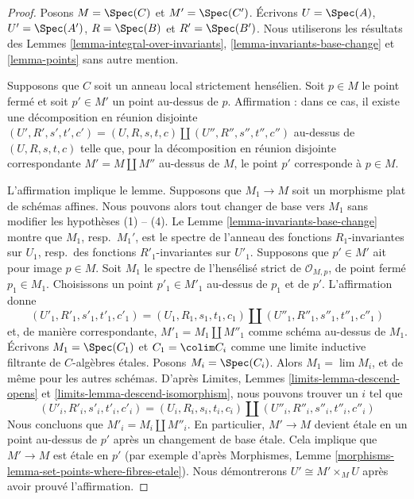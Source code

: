 \begin{proof}
Posons $M = \Spec(C)$ et $M' = \Spec(C')$.
Écrivons $U = \Spec(A)$, $U' = \Spec(A')$, $R = \Spec(B)$ et
$R' = \Spec(B')$. Nous utiliserons les résultats des
Lemmes \ref{lemma-integral-over-invariants},
\ref{lemma-invariants-base-change} et
\ref{lemma-points}
sans autre mention.

\medskip\noindent
Supposons que $C$ soit un anneau local strictement hensélien. Soit $p \in M$
le point fermé et soit $p' \in M'$ un point au-dessus de $p$.
Affirmation : dans ce cas, il existe une décomposition en réunion disjointe
$(U', R', s', t', c') = (U, R, s, t, c) \amalg (U'', R'', s'', t'', c'')$
au-dessus de $(U, R, s, t, c)$ telle que, pour la décomposition en
réunion disjointe correspondante $M' = M \amalg M''$ au-dessus de $M$,
le point $p'$ corresponde à $p \in M$.

\medskip\noindent
L'affirmation implique le lemme. Supposons que $M_1 \to M$ soit un morphisme plat
de schémas affines. Nous pouvons alors tout changer de base vers $M_1$
sans modifier les hypothèses (1) -- (4).
Le Lemme \ref{lemma-invariants-base-change} montre que
$M_1$, resp.\ $M_1'$, est le spectre de l'anneau des
fonctions $R_1$-invariantes sur $U_1$,
resp.\ des fonctions $R'_1$-invariantes sur $U'_1$.
Supposons que $p' \in M'$ ait pour image $p \in M$.
Soit $M_1$ le spectre de l'hensélisé strict de
$\mathcal{O}_{M, p}$, de point fermé $p_1 \in M_1$.
Choisissons un point $p'_1 \in M'_1$ au-dessus de $p_1$ et de $p'$.
L'affirmation donne
$$
(U'_1, R'_1, s'_1, t'_1, c'_1) =
(U_1, R_1, s_1, t_1, c_1) \amalg
(U''_1, R''_1, s''_1, t''_1, c''_1)
$$
et, de manière correspondante, $M'_1 = M_1 \amalg M''_1$ comme schéma au-dessus de $M_1$.
Écrivons $M_1 = \Spec(C_1)$ et $C_1 = \colim C_i$ comme une limite inductive filtrante
de $C$-algèbres \'etales. Posons $M_i = \Spec(C_i)$.
Alors $M_1 = \lim M_i$, et de même pour les autres schémas.
D'après Limites, Lemmes \ref{limits-lemma-descend-opens} et
\ref{limits-lemma-descend-isomorphism},
nous pouvons trouver un $i$ tel que
$$
(U'_i, R'_i, s'_i, t'_i, c'_i) =
(U_i, R_i, s_i, t_i, c_i) \amalg
(U''_i, R''_i, s''_i, t''_i, c''_i)
$$
Nous concluons que $M'_i = M_i \amalg M''_i$. En particulier,
$M' \to M$ devient \'etale en un point au-dessus de $p'$ après un
changement de base \'etale. Cela implique que $M' \to M$ est \'etale en $p'$
(par exemple d'après Morphismes, Lemme
\ref{morphisms-lemma-set-points-where-fibres-etale}).
Nous démontrerons $U' \cong M' \times_M U$ après avoir prouvé l'affirmation.


\end{proof}
